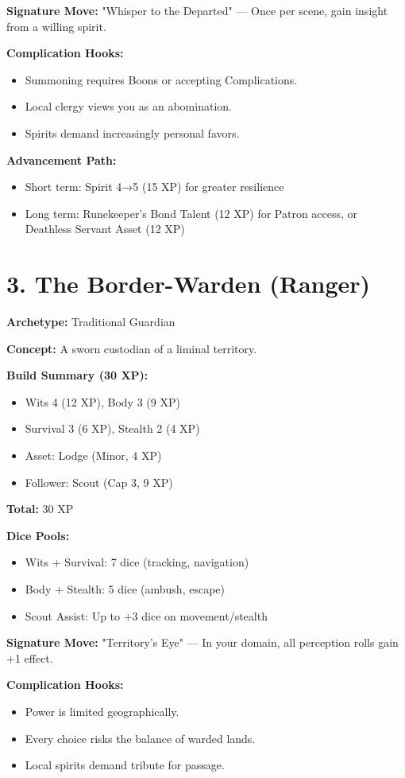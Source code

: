 \textbf{Signature Move:} "Whisper to the Departed" — Once per scene, gain insight from a willing spirit.

\textbf{Complication Hooks:}
\begin{itemize}
  \item Summoning requires Boons or accepting Complications.
  \item Local clergy views you as an abomination.
  \item Spirits demand increasingly personal favors.
\end{itemize}

\textbf{Advancement Path:}
\begin{itemize}
  \item Short term: Spirit 4→5 (15 XP) for greater resilience
  \item Long term: Runekeeper's Bond Talent (12 XP) for Patron access, or Deathless Servant Asset (12 XP)
\end{itemize}

\section{3. The Border-Warden (Ranger)}
\textbf{Archetype:} Traditional Guardian

\textbf{Concept:} A sworn custodian of a liminal territory.

\textbf{Build Summary (30 XP):}
\begin{itemize}
  \item Wits 4 (12 XP), Body 3 (9 XP)
  \item Survival 3 (6 XP), Stealth 2 (4 XP)
  \item Asset: Lodge (Minor, 4 XP)
  \item Follower: Scout (Cap 3, 9 XP)
\end{itemize}
\textbf{Total:} 30 XP

\textbf{Dice Pools:}
\begin{itemize}
  \item Wits + Survival: 7 dice (tracking, navigation)
  \item Body + Stealth: 5 dice (ambush, escape)
  \item Scout Assist: Up to +3 dice on movement/stealth
\end{itemize}

\textbf{Signature Move:} "Territory's Eye" — In your domain, all perception rolls gain +1 effect.

\textbf{Complication Hooks:}
\begin{itemize}
  \item Power is limited geographically.
  \item Every choice risks the balance of warded lands.
  \item Local spirits demand tribute for passage.
\end{itemize}

